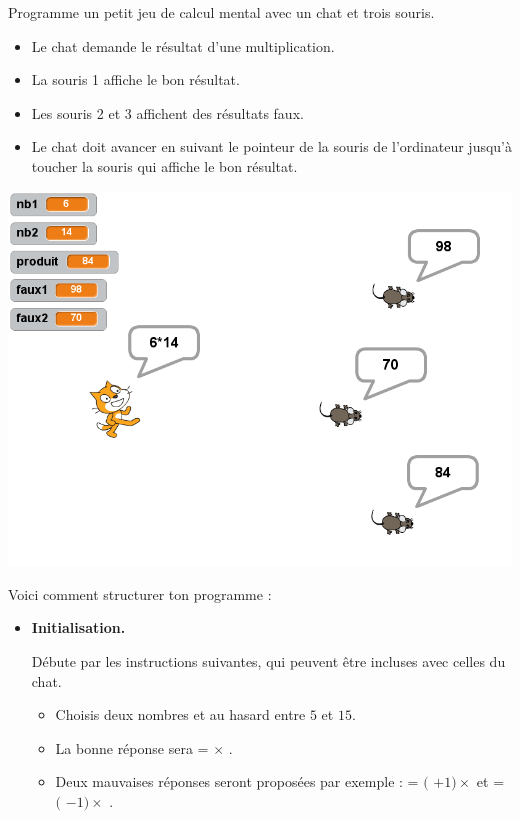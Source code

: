 \documentclass[class=report,crop=false, 12pt]{standalone}
\begin{document}
\begin{activite}

Programme un petit jeu de calcul mental avec un chat et trois souris.
\begin{itemize}
  \item Le chat demande le résultat d'une multiplication.
  \item La souris 1 affiche le bon résultat.
  \item Les souris 2 et 3 affichent des résultats faux.
  \item Le chat doit avancer en suivant le pointeur de la souris de l'ordinateur jusqu'à toucher la souris qui affiche le bon résultat.
\end{itemize}

\begin{center}
  \includegraphics[scale=\scaleecran]{ecran-08-ex2} 
\end{center}

\bigskip
Voici comment structurer ton programme :

\bigskip

\begin{itemize}
  \item \textbf{Initialisation.}
  
  Débute par les instructions suivantes, qui peuvent être incluses avec celles du chat.
  \begin{itemize}
    \item Choisis deux nombres  et  au hasard entre $5$ et $15$.
    \item La bonne réponse sera  =  $\times$  .
    \item Deux mauvaises réponses seront proposées par exemple :   
     = $($ $+1) \times$   et     
     = $($ $-1) \times$  .
        

\end{itemize}
\end{itemize}
\end{activite}
\end{document}
